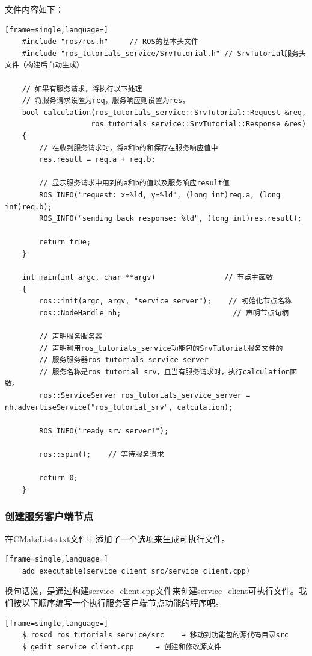 \documentclass[geye,green,kindle,cn]{elegantnote}
\begin{document}
文件内容如下：
\begin{lstlisting}[frame=single,language=]
    #include "ros/ros.h"     // ROS的基本头文件 
    #include "ros_tutorials_service/SrvTutorial.h" // SrvTutorial服务头文件（构建后自动生成） 
    
    // 如果有服务请求，将执行以下处理 
    // 将服务请求设置为req，服务响应则设置为res。
    bool calculation(ros_tutorials_service::SrvTutorial::Request &req,                           
                    ros_tutorials_service::SrvTutorial::Response &res) 
    {  
        // 在收到服务请求时，将a和b的和保存在服务响应值中  
        res.result = req.a + req.b;  
        
        // 显示服务请求中用到的a和b的值以及服务响应result值  
        ROS_INFO("request: x=%ld, y=%ld", (long int)req.a, (long int)req.b);  
        ROS_INFO("sending back response: %ld", (long int)res.result);  
        
        return true; 
    } 
    
    int main(int argc, char **argv)                // 节点主函数 
    {  
        ros::init(argc, argv, "service_server");    // 初始化节点名称  
        ros::NodeHandle nh;                          // 声明节点句柄  
        
        // 声明服务服务器  
        // 声明利用ros_tutorials_service功能包的SrvTutorial服务文件的  
        // 服务服务器ros_tutorials_service_server  
        // 服务名称是ros_tutorial_srv，且当有服务请求时，执行calculation函数。  
        ros::ServiceServer ros_tutorials_service_server = nh.advertiseService("ros_tutorial_srv", calculation);  
        
        ROS_INFO("ready srv server!");  
        
        ros::spin();    // 等待服务请求  
        
        return 0; 
    }
\end{lstlisting}
\subsubsection{创建服务客户端节点}
在CMakeLists.txt文件中添加了一个选项来生成可执行文件。
\begin{lstlisting}[frame=single,language=]
    add_executable(service_client src/service_client.cpp)
\end{lstlisting}

换句话说，是通过构建service_client.cpp文件来创建service_client可执行文件。我 们按以下顺序编写一个执行服务客户端节点功能的程序吧。
\begin{lstlisting}[frame=single,language=]
    $ roscd ros_tutorials_service/src    → 移动到功能包的源代码目录src 
    $ gedit service_client.cpp     → 创建和修改源文件
\end{lstlisting}
\end{document}
